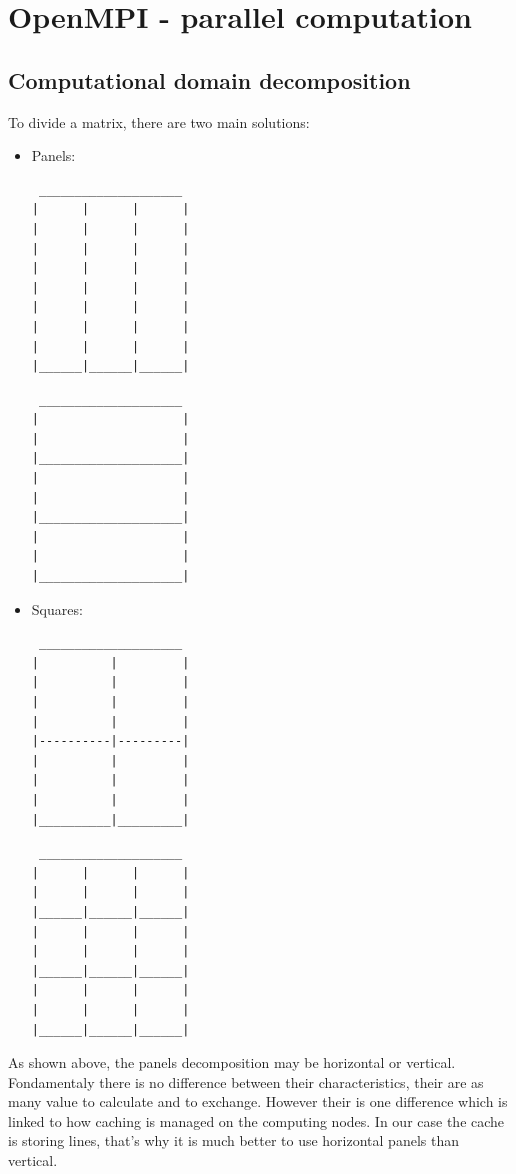\documentclass[a4paper,11pt]{article}
\begin{document}
\clearpage

\section{OpenMPI - parallel computation}

\subsection{Computational domain decomposition}

To divide a matrix, there are two main solutions:
\begin{itemize}
\item{Panels:
\begin{multicols}{2}
\begin{verbatim}
 ____________________
|      |      |      |
|      |      |      |
|      |      |      |
|      |      |      |
|      |      |      |
|      |      |      |
|      |      |      |
|      |      |      |
|______|______|______|
\end{verbatim}
\vspace{1em}
\begin{verbatim}
 ____________________
|                    |
|                    |
|____________________|
|                    |
|                    |
|____________________|
|                    |
|                    |
|____________________|
\end{verbatim}

\end{multicols}
}
\item{Squares:
\begin{multicols}{2}
\begin{verbatim}
 ____________________
|          |         |
|          |         |
|          |         |
|          |         |
|----------|---------|
|          |         |
|          |         |
|          |         |
|__________|_________|
\end{verbatim}

\begin{verbatim}
 ____________________
|      |      |      |
|      |      |      |
|______|______|______|
|      |      |      |
|      |      |      |
|______|______|______|
|      |      |      |
|      |      |      |
|______|______|______|
\end{verbatim}
\end{multicols}
}
\end{itemize}

As shown above, the panels decomposition may be horizontal or vertical. Fondamentaly there
is no difference between their characteristics, their are as many value to calculate and to
exchange. However their is one difference which is linked to how caching is managed on the
computing nodes. In our case the cache is storing lines, that's why it is much better to use
horizontal panels than vertical.
\end{document}
